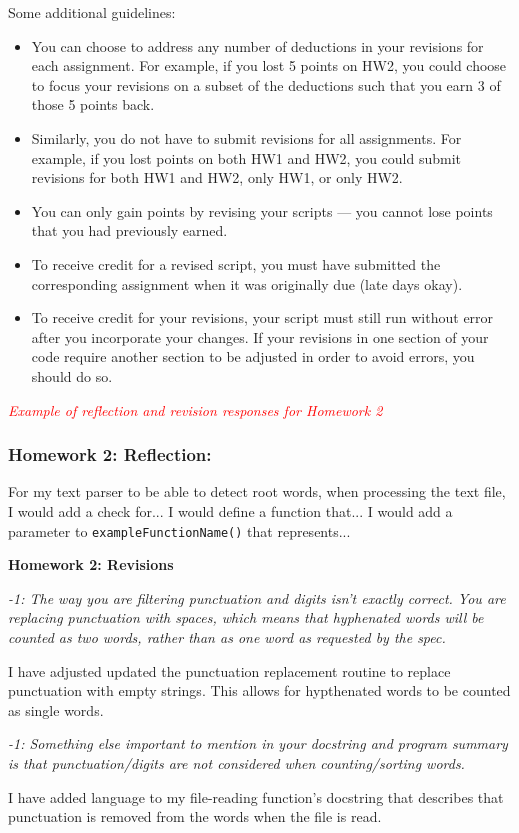 \documentclass{homework}
\begin{document}
Some additional guidelines:
\begin{itemize}
    \item You can choose to address any number of deductions in your revisions for each assignment. For example, if you lost 5 points on HW2, you could choose to focus your revisions on a subset of the deductions such that you earn 3 of those 5 points back. 
    \item Similarly, you do not have to submit revisions for all assignments. For example, if you lost points on both HW1 and HW2, you could submit revisions for both HW1 and HW2, only HW1, or only HW2.
    \item You can only gain points by revising your scripts --- you cannot lose points that you had previously earned.
    \item To receive credit for a revised script, you must have submitted the corresponding assignment when it was originally due (late days okay). 
    \item To receive credit for your revisions, your script must still run without error after you incorporate your changes. If your revisions in one section of your code require another section to be adjusted in order to avoid errors, you should do so.

\end{itemize}

\newpage

\textcolor{red}{\textit{Example of reflection and revision responses for Homework 2}}

\noindent\makebox[\linewidth]{\rule{0.8\paperwidth}{0.4pt}}

\subsubsection*{Homework 2: Reflection:}
For my text parser to be able to detect root words, when processing the text file, I would add a check for... I would define a function that... I would add a parameter to \texttt{exampleFunctionName()} that represents...


\textbf{Homework 2: Revisions}

\textit{-1: The way you are filtering punctuation and digits isn't exactly correct. You are replacing punctuation with spaces, which means that hyphenated words will be counted as two words, rather than as one word as requested by the spec.}

I have adjusted updated the punctuation replacement routine to replace punctuation with empty strings. This allows for hypthenated words to be counted as single words.

\textit{-1: Something else important to mention in your docstring and program summary is that punctuation/digits are not considered when counting/sorting words.}

I have added language to my file-reading function's docstring that describes that punctuation is removed from the words when the file is read.
\end{document}

